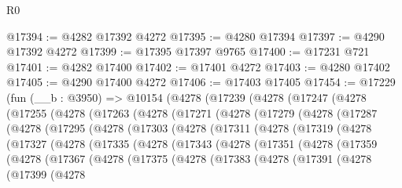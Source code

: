 \begin{lexlean}{R0}
\begin{coremodule}
@17394 := @4282 @17392 @4272
@17395 := @4280 @17394
@17397 := @4290 @17392 @4272
@17399 := @17395 @17397 @9765
@17400 := @17231 @721
@17401 := @4282 @17400
@17402 := @17401 @4272
@17403 := @4280 @17402
@17405 := @4290 @17400 @4272
@17406 := @17403 @17405
@17454 := @17229
    (fun (__b : @3950) =>
    @10154
      (@4278
        (@17239
          (@4278
            (@17247
              (@4278
                (@17255
                  (@4278
                    (@17263
                      (@4278
                        (@17271
                          (@4278
                            (@17279
                              (@4278
                                (@17287
                                  (@4278
                                    (@17295
                                      (@4278
                                        (@17303
                                          (@4278
                                            (@17311
                                              (@4278
                                                (@17319
                                                  (@4278
                                                    (@17327
                                                      (@4278
                                                        (@17335
                                                          (@4278
                                                            (@17343
                                                              (@4278
                                                                (@17351
                                                                  (@4278
                                                                    (@17359
                                                                      (@4278
                                                                        (@17367
                                                                          (@4278
                                                                            (@17375
                                                                              (@4278
                                                                                (@17383
                                                                                  (@4278
                                                                                    (@17391
                                                                                      (@4278
                                                                                        (@17399
                                                                                          (@4278

\end{coremodule}
\end{lexlean}
